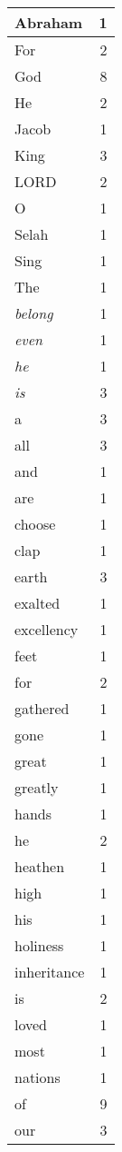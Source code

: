 \begin{center}
\begin{longtable}{l|r}
\hline \hline
\endlastfoot
Abraham & 1 \\ \hline
For & 2 \\ \hline
God & 8 \\ \hline
He & 2 \\ \hline
Jacob & 1 \\ \hline
King & 3 \\ \hline
LORD & 2 \\ \hline
O & 1 \\ \hline
Selah & 1 \\ \hline
Sing & 1 \\ \hline
The & 1 \\ \hline
\emph{belong} & 1 \\ \hline
\emph{even} & 1 \\ \hline
\emph{he} & 1 \\ \hline
\emph{is} & 3 \\ \hline
a & 3 \\ \hline
all & 3 \\ \hline
and & 1 \\ \hline
are & 1 \\ \hline
choose & 1 \\ \hline
clap & 1 \\ \hline
earth & 3 \\ \hline
exalted & 1 \\ \hline
excellency & 1 \\ \hline
feet & 1 \\ \hline
for & 2 \\ \hline
gathered & 1 \\ \hline
gone & 1 \\ \hline
great & 1 \\ \hline
greatly & 1 \\ \hline
hands & 1 \\ \hline
he & 2 \\ \hline
heathen & 1 \\ \hline
high & 1 \\ \hline
his & 1 \\ \hline
holiness & 1 \\ \hline
inheritance & 1 \\ \hline
is & 2 \\ \hline
loved & 1 \\ \hline
most & 1 \\ \hline
nations & 1 \\ \hline
of & 9 \\ \hline
our & 3 \\ \hline

\end{longtable}
\end{center}
